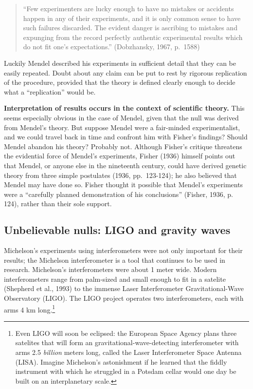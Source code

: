 \documentclass[english,floatsintext,man]{apa6}
\theoremstyle{definition}
\theoremstyle{definition}
\theoremstyle{definition}
\theoremstyle{remark}
\begin{document}
\begin{quote}
\enquote{Few experimenters are lucky enough to have no mistakes or
accidents happen in any of their experiments, and it is only common
sense to have such failures discarded. The evident danger is ascribing
to mistakes and expunging from the record perfectly authentic
experimental results which do not fit one's expectations.} (Dobzhansky,
1967, p.~1588)
\end{quote}

Luckily Mendel described his experiments in sufficient detail that they
can be easily repeated. Doubt about any claim can be put to rest by
rigorous replication of the procedure, provided that the theory is
defined clearly enough to decide what a \enquote{replication} would be.

\textbf{Interpretation of results occurs in the context of scientific
theory.} This seems especially obvious in the case of Mendel, given that
the null was derived from Mendel's theory. But suppose Mendel were a
fair-minded experimentalist, and we could travel back in time and
confront him with Fisher's findings? Should Mendel abandon his theory?
Probably not. Although Fisher's critique threatens the evidential force
of Mendel's experiments, Fisher (1936) himself points out that Mendel,
or anyone else in the nineteenth century, could have derived genetic
theory from three simple postulates (1936, pp.~123-124); he also
believed that Mendel may have done so. Fisher thought it possible that
Mendel's experiments were a \enquote{carefully planned demonstration of
his conclusions} (Fisher, 1936, p. 124), rather than their sole support.

\subsection{Unbelievable nulls: LIGO and gravity
waves}\label{unbelievable-nulls-ligo-and-gravity-waves}

Michelson's experiments using interferometers were not only important
for their results; the Michelson interferometer is a tool that continues
to be used in research. Michelson's interferometers were about 1 meter
wide. Modern interferometers range from palm-sized and small enough to
fit in a satelite (Shepherd et al., 1993) to the immense Laser
Interferometer Gravitational-Wave Observatory (LIGO). The LIGO project
operates two interferometers, each with arms 4 km long.\footnote{Even
  LIGO will soon be eclipsed: the European Space Agency plans three
  satelites that will form an gravitational-wave-detecting
  interferometer with arms 2.5 \emph{billion} meters long, called the
  Laser Interferometer Space Antenna (LISA). Imagine Michelson's
  astonishment if he learned that the fiddly instrument with which he
  struggled in a Potsdam cellar would one day be built on an
  interplanetary scale.}
\end{document}
